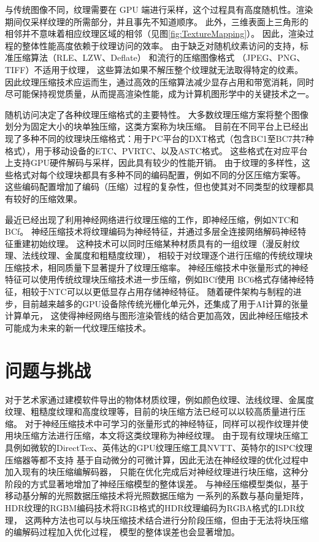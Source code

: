 与传统图像不同，纹理需要在 GPU 端进行采样，这个过程具有高度随机性。渲染期间仅采样纹理的所需部分，并且事先不知道顺序。
此外，三维表面上三角形的相邻并不意味着相应纹理区域的相邻（见图\ref{fig:TextureMapping}）。
因此，渲染过程的整体性能高度依赖于纹理访问的效率。
由于缺乏对随机纹素访问的支持，标准压缩算法（RLE、LZW、Deflate） 和流行的压缩图像格式 （JPEG、PNG、TIFF）不适用于纹理，
这些算法如果不解压整个纹理就无法取得特定的纹素。
因此纹理压缩技术应运而生，通过高效的压缩算法减少显存占用和带宽消耗，同时尽可能保持视觉质量，从而提高渲染性能，成为计算机图形学中的关键技术之一。

随机访问决定了各种纹理压缩格式的主要特性。
大多数纹理压缩方案将整个图像划分为固定大小的块单独压缩，这类方案称为块压缩。
目前在不同平台上已经出现了多种不同的纹理块压缩格式：用于PC平台的DXT格式（包含BC1至BC7共7种格式），用于移动设备的ETC、PVRTC、以及ASTC格式。
这些格式在对应平台上支持GPU硬件解码与采样，因此具有较少的性能开销。
由于纹理的多样性，这些格式对每个纹理块都具有多种不同的编码配置，例如不同的分区压缩方案等。
这些编码配置增加了编码（压缩）过程的复杂性，但也使其对不同类型的纹理都具有较好的压缩效果。

最近已经出现了利用神经网络进行纹理压缩的工作，即神经压缩，例如NTC\cite{vaidyanathan2023random}和BCf\cite{weinreich2024real}。
神经压缩技术将纹理编码为神经特征，并通过多层全连接网络解码神经特征重建初始纹理。
这种技术可以同时压缩某种材质具有的一组纹理（漫反射纹理、法线纹理、金属度和粗糙度纹理），
相较于对纹理逐个进行压缩的传统纹理块压缩技术，相同质量下显著提升了纹理压缩率。
神经压缩技术中张量形式的神经特征可以使用传统纹理块压缩技术进一步压缩，例如BCf\cite{weinreich2024real}使用
BC6格式存储神经特征，相较于NTC\cite{vaidyanathan2023random}可以以更低显存占用存储神经特征。
随着硬件架构与制程的进步，目前越来越多的GPU设备除传统光栅化单元外，还集成了用于AI计算的张量计算单元，
这使得神经网络与图形渲染管线的结合更加高效，因此神经压缩技术可能成为未来的新一代纹理压缩技术。

\section{问题与挑战}

对于艺术家通过建模软件导出的物体材质纹理，例如颜色纹理、法线纹理、金属度纹理、粗糙度纹理和高度纹理等，目前的块压缩方法已经可以以较高质量进行压缩。
对于神经压缩技术中可学习的张量形式的神经特征，同样可以视作纹理并使用块压缩方法进行压缩，本文将这类纹理称为神经纹理。
由于现有纹理块压缩工具例如微软的DirectTex、英伟达的GPU纹理压缩工具NVTT、英特尔的ISPC纹理压缩器等都不支持
基于自动微分的可微计算，因此无法在神经纹理的优化过程中加入现有的块压缩编解码器，
只能在优化完成后对神经纹理进行块压缩，这种分阶段的方式显著地增加了神经压缩模型的整体误差。
与神经压缩模型类似，基于移动基分解的光照数据压缩技术\cite{silvennoinen2021moving}将光照数据压缩为
一系列的系数与基向量矩阵，HDR纹理的RGBM编码技术将RGB格式的HDR纹理编码为RGBA格式的LDR纹理，
这两种方法也可以与块压缩技术结合进行分阶段压缩，但由于无法将块压缩的编解码过程加入优化过程，
模型的整体误差也会显著增加。

